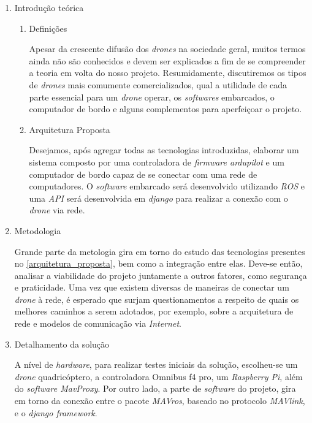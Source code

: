 \documentclass[12pt,a4paper,oneside]{book}
\begin{document}
\begin{enumerate}
     \item Introdução teórica 
     
     \begin{enumerate}
     
         \item Definições
         
         Apesar da crescente difusão dos \textit{drones} na sociedade geral, muitos termos ainda não são conhecidos e devem ser explicados a fim de se compreender a teoria em volta do nosso projeto. Resumidamente, discutiremos os tipos de \textit{drones} mais comumente comercializados, qual a utilidade de cada parte essencial para um \textit{drone} operar,  os \textit{softwares} embarcados, o computador de bordo e alguns complementos para aperfeiçoar o projeto.
         
         \item Arquitetura Proposta \label{arquitetura_proposta}
 
         Desejamos, após agregar todas as tecnologias introduzidas, elaborar um sistema composto por uma controladora de \textit{firmware ardupilot} e um computador de bordo capaz de se conectar com uma rede de computadores. O \textit{software} embarcado será desenvolvido utilizando \textit{ROS} e uma \textit{API} será desenvolvida em \textit{django} para realizar a conexão com o \textit{drone} via rede.
 
     \end{enumerate}
     
     \item Metodologia

     Grande parte da metologia gira em torno do estudo das tecnologias presentes no \cref{arquitetura_proposta}, bem como a integração entre elas. Deve-se então, analisar a viabilidade do projeto juntamente a outros fatores, como segurança e praticidade.
     Uma vez que existem diversas de maneiras de conectar um \textit{drone} à rede, é esperado que surjam questionamentos a respeito de quais os melhores caminhos a serem adotados, por exemplo, sobre a arquitetura de rede e modelos de comunicação via \textit{Internet}.
 
     \item Detalhamento da solução \label{item:solucao}
     
     A nível de \textit{hardware}, para realizar testes iniciais da 
     solução, escolheu-se um \textit{drone} quadricóptero, a controladora 
     Omnibus f4 pro, um \textit{Raspberry Pi}, além do \textit{software MavProxy}. 
     Por outro lado, a parte de \textit{software} do projeto, gira em torno
     da conexão entre o pacote \textit{MAVros}, baseado no protocolo 
     \textit{MAVlink}, e o \textit{django framework}.
     

\end{enumerate}
\end{document}
